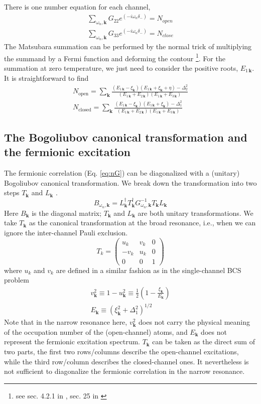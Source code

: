 \documentclass[reprint,pra]{revtex4-1}
\newcommand{\vk}{\ensuremath{\mathbf{k}}}
\newcommand{\nth}[1]{\ensuremath{\frac{1}{#1}}}
\newcommand{\br}[1]{\ensuremath{\left(#1\right)}}
\newcommand{\mtrx}[1]{\ensuremath{\begin{pmatrix}#1\end{pmatrix}}}
\newcommand{\dg}{\ensuremath{\dagger}}
\begin{document}
   There is one  number equation for each channel,  
\begin{gather*}
\sum_{\omega_{n}, \vk}G_{22}e^{(-i\omega_n\delta_-)}=N_{open}\\
\sum_{\omega_{n},\vk}G_{33}e^{(-i\omega_n\delta_-)}=N_{close}
\end{gather*}
 The Matsubara summation can be performed by the normal trick of multiplying the summand by a Fermi function and deforming the contour \footnote{see sec. 4.2.1 in \cite{Altland}, sec. 25 in \cite{Fetter}}.  For the summation at zero temperature, we just need to consider the positive roots, $E_{1\,\vk}$.  It is straightforward to find 
\begin{gather}
N_{\text{open}}=\sum_{\vk}\frac{(E_{1\,\vk}-\xi_{\vk})(E_{1\,\vk}+\xi_{\vk}+\eta)-\Delta_2^2}{(E_{1\,\vk}+E_{2\,\vk})(E_{1\,\vk}+E_{3\,\vk})}
\label{eq:pathInt2:numOpen}\\
N_{\text{closed}}=\sum_{\vk}\frac{(E_{1\,\vk}-\xi_{\vk})(E_{1\,\vk}+\xi_{\vk})-\Delta_1^2}{(E_{1\,\vk}+E_{2\,\vk})(E_{1\,\vk}+E_{3\,\vk})}
\label{eq:pathInt2:numClose}
\end{gather}
 \subsection{The Bogoliubov canonical transformation and the  fermionic excitation\label{sec:fermionic}}
 The fermionic correlation (Eq. \ref{eq:nG}) can be diagonalized with a (unitary) Bogoliubov canonical transformation.  We  break down the transformation into two steps $T_{\vk}$ and $L_{\vk}$ . 
\begin{equation}\label{eq:pathInt2:B}
B_{\omega_{n},\vk}=L_{\vk}^{\dg}T_{\vk}^{\dg}G_{\omega_{n},\vk}^{-1}T_{\vk}L_{\vk}
\end{equation} 
Here $B_{\vk}$ is the diagonal matrix; $T_{\vk}$ and $L_{\vk}$ are both unitary transformations.  We take $T_{\vk}$ as the canonical transformation at the broad resonance, i.e., when we can ignore the inter-channel Pauli exclusion. 
\begin{equation}\label{eq:pathInt2:T}
T_k=\mtrx{u_k&v_k&0\\-v_k&u_k&0\\0&0&1}
\end{equation}	
where $u_{k}$ and $v_{k}$ are defined in a similar fashion as in the single-channel BCS  problem
\begin{gather}
v_{\vk}^{2}\equiv1-u_{\vk}^{2}\equiv\nth{2}\br{1-\frac{\xi_{\vk}}{E_{\vk}}}\\
E_{\vk}\equiv(\xi_{\vk}^{2}+\Delta_{1}^{2})^{1/2}
\end{gather}
 Note that in the narrow resonance here,  $v_{\vk}^{2}$  does not carry the physical meaning of the occupation number of the (open-channel) atoms, and $E_{\vk}$   does not represent the fermionic excitation spectrum. $T_{\vk}$ can be taken as the direct sum of two parts, the first two rows/columns describe the open-channel excitations, while the third row/column describes the closed-channel ones.  It nevertheless is not sufficient to diagonalize the fermionic correlation in the narrow resonance.  
\end{document}
